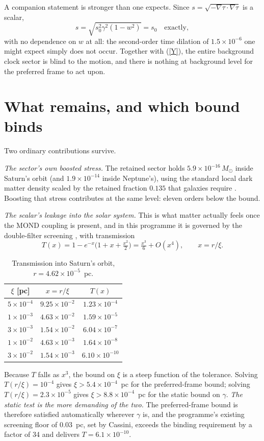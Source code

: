 \documentclass[11pt,letterpaper]{article}
\begin{document}
A companion statement is stronger than one expects. Since $s=\sqrt{-\nabla\tau\cdot\nabla\tau}$ is a scalar,
\begin{equation}
s=\sqrt{s_0^2\gamma^2(1-w^2)}=s_0 \quad\text{exactly},
\end{equation}
with no dependence on $w$ at all: the second-order time dilation of $1.5\times10^{-6}$ one might expect simply does not occur. Together with (\ref{Y}), the entire background clock sector is blind to the motion, and there is nothing at background level for the preferred frame to act upon.

\section{What remains, and which bound binds}
Two ordinary contributions survive.

\emph{The sector's own boosted stress.} The retained sector holds $5.9\times10^{-16}\,M_\odot$ inside Saturn's orbit (and $1.9\times10^{-14}$ inside Neptune's), using the standard local dark matter density scaled by the retained fraction $0.135$ that galaxies require \cite{paper18}. Boosting that stress contributes at the same level: eleven orders below the bound.

\emph{The scalar's leakage into the solar system.} This is what matter actually feels once the MOND coupling is present, and in this programme it is governed by the double-filter screening \cite{repo}, with transmission
\begin{equation}
T(x)=1-e^{-x}\Big(1+x+\tfrac{x^2}{2}\Big)=\tfrac{x^3}{6}+O(x^4),\qquad x=r/\xi .
\end{equation}
\begin{table}[h]\centering\caption{Transmission into Saturn's orbit, $r=4.62\times10^{-5}$~pc.}\label{tab}
\begin{tabular}{ccc}\toprule
$\xi$ [pc] & $x=r/\xi$ & $T(x)$\\\midrule
$5\times10^{-4}$ & $9.25\times10^{-2}$ & $1.23\times10^{-4}$\\
$1\times10^{-3}$ & $4.63\times10^{-2}$ & $1.59\times10^{-5}$\\
$3\times10^{-3}$ & $1.54\times10^{-2}$ & $6.04\times10^{-7}$\\
$1\times10^{-2}$ & $4.63\times10^{-3}$ & $1.64\times10^{-8}$\\
$3\times10^{-2}$ & $1.54\times10^{-3}$ & $6.10\times10^{-10}$\\\bottomrule
\end{tabular}\end{table}
Because $T$ falls as $x^3$, the bound on $\xi$ is a steep function of the tolerance. Solving $T(r/\xi)=10^{-4}$ gives $\xi>5.4\times10^{-4}$~pc for the preferred-frame bound; solving $T(r/\xi)=2.3\times10^{-5}$ gives $\xi>8.8\times10^{-4}$~pc for the static bound on $\gamma$. \emph{The static test is the more demanding of the two.} The preferred-frame bound is therefore satisfied automatically wherever $\gamma$ is, and the programme's existing screening floor of $0.03$~pc, set by Cassini, exceeds the binding requirement by a factor of 34 and delivers $T=6.1\times10^{-10}$.
\end{document}
